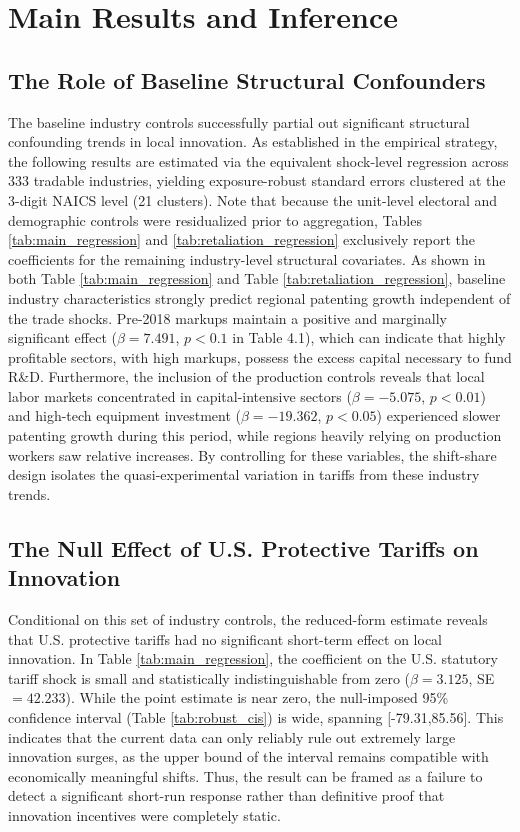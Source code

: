 \documentclass[12pt]{article}
\numberwithin{figure}{section}
\numberwithin{table}{section}
\begin{document}
\newpage
\section{Main Results and Inference}
\subsection{The Role of Baseline Structural Confounders}

The baseline industry controls successfully partial out significant structural confounding trends in local innovation. As established in the empirical strategy, the following results are estimated via the equivalent shock-level regression across $333$ tradable industries, yielding exposure-robust standard errors clustered at the 3-digit NAICS level (21 clusters). Note that because the unit-level electoral and demographic controls were residualized prior to aggregation, Tables \ref{tab:main_regression} and \ref{tab:retaliation_regression} exclusively report the coefficients for the remaining industry-level structural covariates. As shown in both Table \ref{tab:main_regression} and Table \ref{tab:retaliation_regression}, baseline industry characteristics strongly predict regional patenting growth independent of the trade shocks. Pre-2018 markups maintain a positive and marginally significant effect ($\beta=7.491$, $p<0.1$ in Table 4.1), which can indicate that highly profitable sectors, with high markups, possess the excess capital necessary to fund R\&D. Furthermore, the inclusion of the \cite{Acemoglu2016} production controls reveals that local labor markets concentrated in capital-intensive sectors ($\beta=-5.075$, $p<0.01$) and high-tech equipment investment ($\beta=-19.362$, $p<0.05$) experienced slower patenting growth during this period, while regions heavily relying on production workers saw relative increases. By controlling for these variables, the shift-share design isolates the quasi-experimental variation in tariffs from these industry trends.

\subsection{The Null Effect of U.S. Protective Tariffs on Innovation}

Conditional on this set of industry controls, the reduced-form estimate reveals that U.S. protective tariffs had no significant short-term effect on local innovation. In Table \ref{tab:main_regression}, the coefficient on the U.S. statutory tariff shock is small and statistically indistinguishable from zero ($\beta = 3.125$, SE $= 42.233$). While the point estimate is near zero, the null-imposed 95\% confidence interval (Table \ref{tab:robust_cis}) is wide, spanning [-79.31,85.56]. This indicates that the current data can only reliably rule out extremely large innovation surges, as the upper bound of the interval remains compatible with economically meaningful shifts. Thus, the result can be framed as a failure to detect a significant short-run response rather than definitive proof that innovation incentives were completely static.
\end{document}
